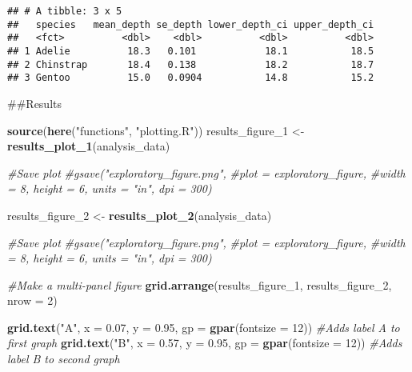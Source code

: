 \documentclass[
]{article}
\newenvironment{Shaded}{\begin{snugshade}}{\end{snugshade}}
\newcommand{\AttributeTok}[1]{\textcolor[rgb]{0.13,0.29,0.53}{#1}}
\newcommand{\CommentTok}[1]{\textcolor[rgb]{0.56,0.35,0.01}{\textit{#1}}}
\newcommand{\DecValTok}[1]{\textcolor[rgb]{0.00,0.00,0.81}{#1}}
\newcommand{\FloatTok}[1]{\textcolor[rgb]{0.00,0.00,0.81}{#1}}
\newcommand{\FunctionTok}[1]{\textcolor[rgb]{0.13,0.29,0.53}{\textbf{#1}}}
\newcommand{\NormalTok}[1]{#1}
\newcommand{\OtherTok}[1]{\textcolor[rgb]{0.56,0.35,0.01}{#1}}
\newcommand{\StringTok}[1]{\textcolor[rgb]{0.31,0.60,0.02}{#1}}
\begin{document}
\begin{verbatim}
## # A tibble: 3 x 5
##   species   mean_depth se_depth lower_depth_ci upper_depth_ci
##   <fct>          <dbl>    <dbl>          <dbl>          <dbl>
## 1 Adelie          18.3   0.101            18.1           18.5
## 2 Chinstrap       18.4   0.138            18.2           18.7
## 3 Gentoo          15.0   0.0904           14.8           15.2
\end{verbatim}

\#\#Results

\begin{Shaded}
\begin{Highlighting}[]
\FunctionTok{source}\NormalTok{(}\FunctionTok{here}\NormalTok{(}\StringTok{"functions"}\NormalTok{, }\StringTok{"plotting.R"}\NormalTok{))}
\NormalTok{results\_figure\_1 }\OtherTok{\textless{}{-}} \FunctionTok{results\_plot\_1}\NormalTok{(analysis\_data)}

\CommentTok{\#Save plot }
\CommentTok{\#gsave("exploratory\_figure.png", }
       \CommentTok{\#plot = exploratory\_figure, }
       \CommentTok{\#width = 8, height = 6, units = "in", dpi = 300)}
       
\NormalTok{results\_figure\_2 }\OtherTok{\textless{}{-}} \FunctionTok{results\_plot\_2}\NormalTok{(analysis\_data)}

\CommentTok{\#Save plot }
\CommentTok{\#gsave("exploratory\_figure.png", }
       \CommentTok{\#plot = exploratory\_figure, }
       \CommentTok{\#width = 8, height = 6, units = "in", dpi = 300)}

\CommentTok{\#Make a multi{-}panel figure}
\FunctionTok{grid.arrange}\NormalTok{(results\_figure\_1,  results\_figure\_2,  }\AttributeTok{nrow =} \DecValTok{2}\NormalTok{)}

\FunctionTok{grid.text}\NormalTok{(}\StringTok{"A"}\NormalTok{, }\AttributeTok{x =} \FloatTok{0.07}\NormalTok{, }\AttributeTok{y =} \FloatTok{0.95}\NormalTok{, }\AttributeTok{gp =} \FunctionTok{gpar}\NormalTok{(}\AttributeTok{fontsize =} \DecValTok{12}\NormalTok{)) }\CommentTok{\#Adds label \textquotesingle{}A\textquotesingle{} to first graph}
\FunctionTok{grid.text}\NormalTok{(}\StringTok{"B"}\NormalTok{, }\AttributeTok{x =} \FloatTok{0.57}\NormalTok{, }\AttributeTok{y =} \FloatTok{0.95}\NormalTok{, }\AttributeTok{gp =} \FunctionTok{gpar}\NormalTok{(}\AttributeTok{fontsize =} \DecValTok{12}\NormalTok{)) }\CommentTok{\#Adds label \textquotesingle{}B\textquotesingle{} to second graph}
\end{Highlighting}
\end{Shaded}
\end{document}
